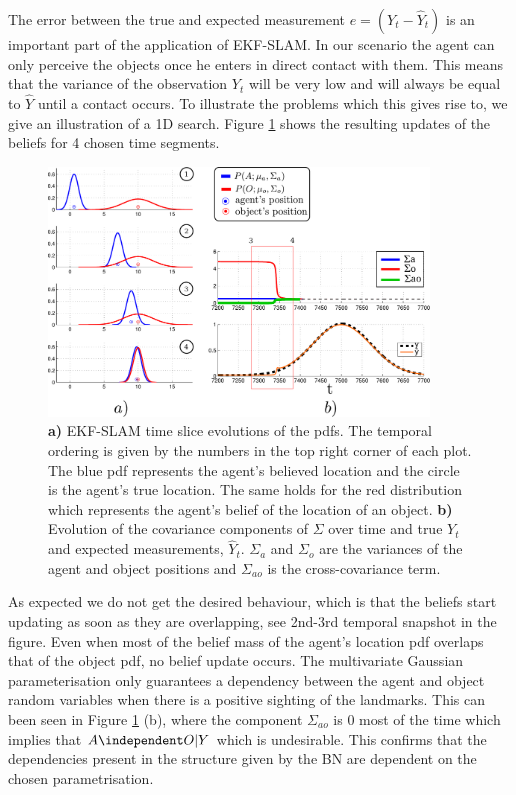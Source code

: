 The error between the true and expected measurement $e = (Y_t - \hat{Y}_t)$ is an important part of the application of EKF-SLAM.
In our scenario the agent can only perceive the objects once he enters in direct contact with them. 
This means that the variance of the observation $Y_t$ will be very low and will always be equal to $\hat{Y}$ until a contact occurs. 
To illustrate the problems which this gives rise to, we give an illustration of a 1D search. Figure \ref{fig:EKF-SLAM} shows the 
resulting updates of the beliefs for 4 chosen time segments.

\begin{figure}
\centering
 \includegraphics[width=0.9\textwidth]{./ch5-MLMF/Figures/Figure34.pdf}
\caption{\textbf{a)} EKF-SLAM time slice evolutions of the pdfs. 
The temporal ordering is given by the numbers in the top right corner of each plot.
The blue pdf represents the agent's believed location and the circle is the agent's true location. The same holds 
for the red distribution which represents the agent's belief of the location of an object.
\textbf{b)} Evolution of the covariance components of $\Sigma$ over time and true $Y_t$ and expected measurements,  $\hat{Y}_t$. 
$\Sigma_a$ and $\Sigma_o$ are the variances of the agent and object positions and $\Sigma_{ao}$ is the cross-covariance 
term.}
\label{fig:EKF-SLAM}
\end{figure}

As expected we do not get the desired behaviour, which is that the beliefs start updating as soon as they are overlapping, 
see 2nd-3rd temporal snapshot in the figure. 
Even when most of the belief mass of the agent's location pdf overlaps that of the object pdf, no belief update occurs. 
The multivariate Gaussian parameterisation only guarantees a dependency between the agent and object random variables 
when there is a positive sighting of the landmarks.  This can been seen in Figure \ref{fig:EKF-SLAM} (b),
where the component $\Sigma_{ao}$ is 0 most of the time which implies that $A \independent O | Y$ which is undesirable. 
This confirms that the dependencies present in the structure given by the BN are dependent on the chosen parametrisation.

